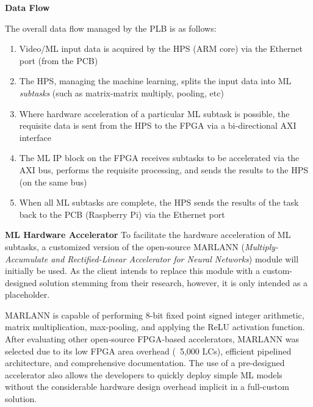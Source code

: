 \textbf{Data Flow}

The overall data flow managed by the PLB is as follows:
\begin{enumerate}
\item Video/ML input data is acquired by the HPS (ARM core) via the Ethernet port (from the PCB)
\item The HPS, managing the machine learning, splits the input data into ML \textit{subtasks} (such as matrix-matrix multiply, pooling, etc)
\item Where hardware acceleration of a particular ML subtask is possible, the requisite data is sent from the HPS to the FPGA via a bi-directional AXI interface
\item The ML IP block on the FPGA receives subtasks to be accelerated via the AXI bus, performs the requisite processing, and sends the results to the HPS (on the same bus)
\item When all ML subtasks are complete, the HPS sends the results of the task back to the PCB (Raspberry Pi) via the Ethernet port
\end{enumerate}

\textbf{ML Hardware Accelerator}
To facilitate the hardware acceleration of ML subtasks, a customized version of the open-source MARLANN (\textit{Multiply-Accumulate and Rectified-Linear Accelerator for Neural Networks}) module will initially be used. As the client intends to replace this module with a custom-designed solution stemming from their research, however, it is only intended as a placeholder.

MARLANN is capable of performing 8-bit fixed point signed integer arithmetic, matrix multiplication, max-pooling, and applying the ReLU activation function. After evaluating other open-source FPGA-based accelerators, MARLANN was selected due to its low FPGA area overhead (~5,000 LCs), efficient pipelined architecture, and comprehensive documentation. The use of a pre-designed accelerator also allows the developers to quickly deploy simple ML models without the considerable hardware design overhead implicit in a full-custom solution.
